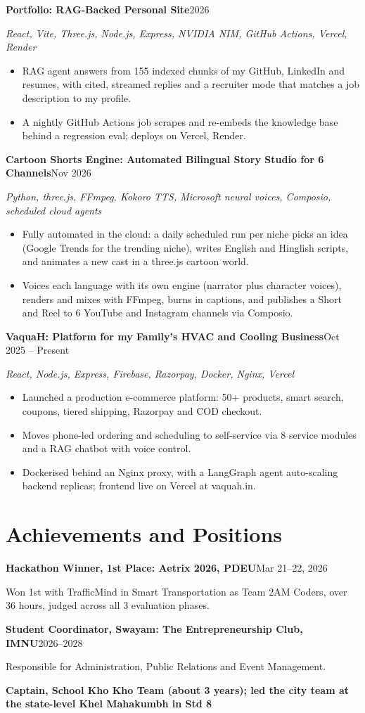 \documentclass[a4paper,9pt]{extarticle}
\newcommand{\entry}[2]{%
  \textbf{#1}\hfill{\small #2}\par\vspace{1pt}}
\newcommand{\sub}[2]{%
  {\small\itshape #1}\hfill{\small\itshape #2}\par\vspace{2pt}}
\begin{document}
\entry{Portfolio: RAG-Backed Personal Site}{2026}
\sub{React, Vite, Three.js, Node.js, Express, NVIDIA NIM, GitHub Actions, Vercel, Render}{}
\begin{itemize}
  \item RAG agent answers from 155 indexed chunks of my GitHub, LinkedIn and resumes, with cited, streamed replies and a recruiter mode that matches a job description to my profile.
  \item A nightly GitHub Actions job scrapes and re-embeds the knowledge base behind a regression eval; deploys on Vercel, Render.
\end{itemize}

\entry{Cartoon Shorts Engine: Automated Bilingual Story Studio for 6 Channels}{Nov 2026}
\sub{Python, three.js, FFmpeg, Kokoro TTS, Microsoft neural voices, Composio, scheduled cloud agents}{}
\begin{itemize}
  \item Fully automated in the cloud: a daily scheduled run per niche picks an idea (Google Trends for the trending niche), writes English and Hinglish scripts, and animates a new cast in a three.js cartoon world.
  \item Voices each language with its own engine (narrator plus character voices), renders and mixes with FFmpeg, burns in captions, and publishes a Short and Reel to 6 YouTube and Instagram channels via Composio.
\end{itemize}

\entry{VaquaH: Platform for my Family's HVAC and Cooling Business}{Oct 2025 -- Present}
\sub{React, Node.js, Express, Firebase, Razorpay, Docker, Nginx, Vercel}{}
\begin{itemize}
  \item Launched a production e-commerce platform: 50+ products, smart search, coupons, tiered shipping, Razorpay and COD checkout.
  \item Moves phone-led ordering and scheduling to self-service via 8 service modules and a RAG chatbot with voice control.
  \item Dockerised behind an Nginx proxy, with a LangGraph agent auto-scaling backend replicas; frontend live on Vercel at vaquah.in.
\end{itemize}

\section{Achievements and Positions}
\entry{Hackathon Winner, 1st Place: Aetrix 2026, PDEU}{Mar 21--22, 2026}
{\small Won 1st with TrafficMind in Smart Transportation as Team 2AM Coders, over 36 hours, judged across all 3 evaluation phases.}\par\vspace{3pt}
\entry{Student Coordinator, Swayam: The Entrepreneurship Club, IMNU}{2026--2028}
{\small Responsible for Administration, Public Relations and Event Management.}\par\vspace{3pt}
\entry{Captain, School Kho Kho Team {\normalfont\small (about 3 years); led the city team at the state-level Khel Mahakumbh in Std 8}}{}
\end{document}
